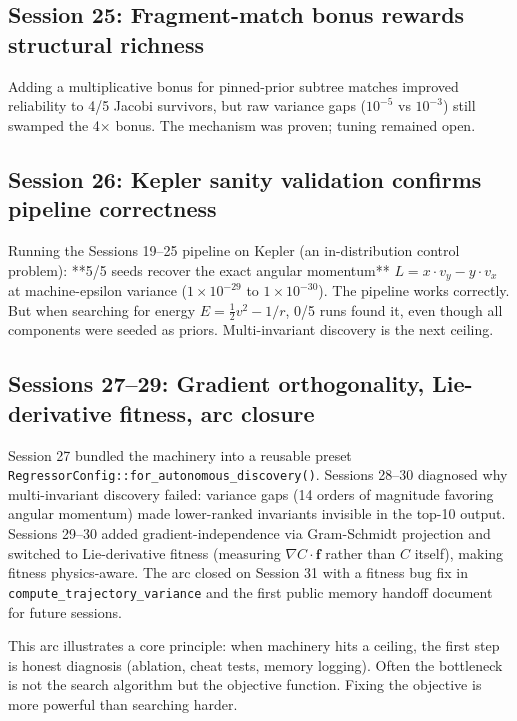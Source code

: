 \subsection{Session 25: Fragment-match bonus rewards structural richness}

Adding a multiplicative bonus for pinned-prior subtree matches improved reliability to 4/5 Jacobi survivors, but raw variance gaps ($10^{-5}$ vs $10^{-3}$) still swamped the 4× bonus. The mechanism was proven; tuning remained open.

\subsection{Session 26: Kepler sanity validation confirms pipeline correctness}

Running the Sessions 19--25 pipeline on Kepler (an in-distribution control problem): **5/5 seeds recover the exact angular momentum** $L = x \cdot v_y - y \cdot v_x$ at machine-epsilon variance ($1 \times 10^{-29}$ to $1 \times 10^{-30}$). The pipeline works correctly. But when searching for energy $E = \tfrac{1}{2}v^2 - 1/r$, 0/5 runs found it, even though all components were seeded as priors. Multi-invariant discovery is the next ceiling.

\subsection{Sessions 27--29: Gradient orthogonality, Lie-derivative fitness, arc closure}

Session 27 bundled the machinery into a reusable preset \texttt{RegressorConfig::for\_autonomous\_discovery()}. Sessions 28--30 diagnosed why multi-invariant discovery failed: variance gaps (14 orders of magnitude favoring angular momentum) made lower-ranked invariants invisible in the top-10 output. Sessions 29--30 added gradient-independence via Gram-Schmidt projection and switched to Lie-derivative fitness (measuring $\nabla C \cdot \mathbf{f}$ rather than $C$ itself), making fitness physics-aware. The arc closed on Session 31 with a fitness bug fix in \texttt{compute\_trajectory\_variance} and the first public memory handoff document for future sessions.

This arc illustrates a core principle: when machinery hits a ceiling, the first step is honest diagnosis (ablation, cheat tests, memory logging). Often the bottleneck is not the search algorithm but the objective function. Fixing the objective is more powerful than searching harder.

